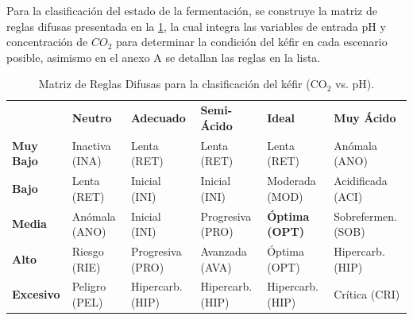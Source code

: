 Para la clasificación del estado de la fermentación, se construye la matriz de reglas difusas 
presentada en la \cref{tab:reglas_co2_ph},
la cual integra las variables de entrada pH y concentración de $CO_{2}$ para determinar la condición 
del kéfir en cada escenario posible, asimismo en el anexo A se detallan las reglas en la lista.
\begin{table}[htbp]
    \centering
    \caption{Matriz de Reglas Difusas para la clasificación del kéfir ($\text{CO}_2$ vs. pH).}
    \label{tab:reglas_co2_ph}
    
    \begin{tabularx}{\textwidth}{|>{\centering\arraybackslash}X|>{\centering\arraybackslash}X|>{\centering\arraybackslash}X|>{\centering\arraybackslash}X|>{\centering\arraybackslash}X|>{\centering\arraybackslash}X|}
        \hline
        
        \multirow{2}{*}{\textbf{CO$_2$}} & \multicolumn{5}{c|}{\textbf{pH}} \\
        \cline{2-6}
        
        & \textbf{Neutro} & \textbf{Adecuado} & \textbf{Semi-Ácido} & \textbf{Ideal} & \textbf{Muy Ácido} \\
        \hline
        
        \textbf{Muy Bajo} 
        & Inactiva (INA) 
        & Lenta (RET) 
        & Lenta (RET) 
        & Lenta (RET) 
        & Anómala (ANO) \\
        \hline
        
        \textbf{Bajo} 
        & Lenta (RET) 
        & Inicial (INI) 
        & Inicial (INI) 
        & Moderada (MOD) 
        & Acidificada (ACI) \\
        \hline
        
        \textbf{Media} 
        & Anómala (ANO) 
        & Inicial (INI) 
        & Progresiva (PRO) 
        & \textbf{Óptima (OPT)} 
        & Sobrefermen. (SOB) \\
        \hline
        
        \textbf{Alto} 
        & Riesgo (RIE) 
        & Progresiva (PRO) 
        & Avanzada (AVA) 
        & Óptima (OPT) 
        & Hipercarb. (HIP) \\
        \hline
        
        \textbf{Excesivo} 
        & Peligro (PEL) 
        & Hipercarb. (HIP) 
        & Hipercarb. (HIP) 
        & Hipercarb. (HIP) 
        & Crítica (CRI) \\ 
        \hline
    \end{tabularx}
\end{table}

